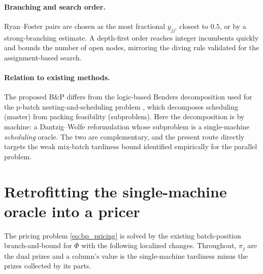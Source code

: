 \documentclass[review,3p,times,authoryear]{elsarticle}
\begin{document}
\paragraph{Branching and search order.} Ryan--Foster pairs are chosen as the most
fractional $y_{jj'}$ closest to $0.5$, or by a strong-branching estimate. A
depth-first order reaches integer incumbents quickly and bounds the number of open
nodes, mirroring the diving rule validated for the assignment-based search.

\paragraph{Relation to existing methods.} The proposed B\&P differs from the
logic-based Benders decomposition used for the p-batch nesting-and-scheduling
problem \citep{nascimento2024}, which decomposes scheduling (master) from packing
feasibility (subproblem). Here the decomposition is by machine: a Dantzig--Wolfe
reformulation whose subproblem is a single-machine \emph{scheduling} oracle. The
two are complementary, and the present route directly targets the weak
mix-batch tardiness bound identified empirically for the parallel problem.

\section{Retrofitting the single-machine oracle into a pricer}
\label{sec:bp_retrofit}

The pricing problem \eqref{eq:bp_pricing} is solved by the existing
batch-position branch-and-bound for $\Phi$ with the following localized changes.
Throughout, $\pi_j$ are the dual prizes and a column's value is the
single-machine tardiness minus the prizes collected by its parts.
\end{document}

